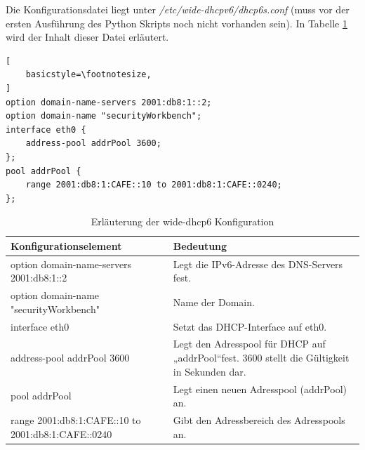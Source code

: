 Die Konfigurationsdatei liegt unter \textit{/etc/wide-dhcpv6/dhcp6s.conf} (muss vor der ersten Ausführung des Python Skripts noch nicht vorhanden sein). In Tabelle \ref{tab:wideDhcpConfig} wird der Inhalt dieser Datei erläutert.
\begin{lstlisting}[
	basicstyle=\footnotesize,
]
option domain-name-servers 2001:db8:1::2;
option domain-name "securityWorkbench";
interface eth0 {
	address-pool addrPool 3600;
};
pool addrPool {
	range 2001:db8:1:CAFE::10 to 2001:db8:1:CAFE::0240;
};

\end{lstlisting}

\begin{table}
	\centering
		\begin{tabular}{lp{9cm}}
			Konfigurationselement & Bedeutung \\ \hline
			option domain-name-servers 2001:db8:1::2 & Legt die IPv6-Adresse des DNS-Servers fest. \\
			option domain-name "securityWorkbench" & Name der Domain. \\
			interface eth0 & Setzt das DHCP-Interface auf eth0. \\
			address-pool addrPool 3600 & Legt den Adresspool für DHCP auf „addrPool“fest. 3600 stellt die Gültigkeit in Sekunden dar.  \\
			pool addrPool & Legt einen neuen Adresspool (addrPool) an. \\
			range 2001:db8:1:CAFE::10 to 2001:db8:1:CAFE::0240 & Gibt den Adressbereich des Adresspools an. \\
		\end{tabular}
	\caption{Erläuterung der wide-dhcp6 Konfiguration}
	\label{tab:wideDhcpConfig}
\end{table}

\FloatBarrier


